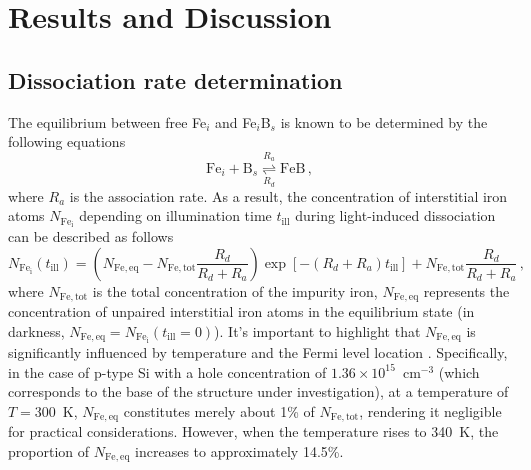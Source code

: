 \documentclass{WileyMSP-template}
\begin{document}
%
%
%
%


\section{Results and Discussion}

\subsection{Dissociation rate determination}\label{SecR}

The equilibrium between free Fe$_i$ and Fe$_i$B$_s$ is known to be determined by the following equations \cite{FeB:kinetic,Sun2021,FeBAssJAP2014}
\begin{equation}
\label{eqReac}
\mathrm{Fe}_i+\mathrm{B}_s  \overset{R_a}{\underset{R_d}{\rightleftharpoons{}}} \mathrm{FeB}\,,
\end{equation}
where
$R_a$ is the association rate.
As a result, the concentration of interstitial iron atoms $N_\mathrm{Fe_i}$ depending on illumination time $t_\mathrm{ill}$ 
during light-induced dissociation can be described as follows \cite{FeBLight2,FeBKin2019,Olikh2021JAP}
\begin{equation}
\label{eqNfeill}
N_\mathrm{Fe_i}(t_\mathrm{ill})=\left(N_\mathrm{Fe,eq}-N_\mathrm{Fe,tot}
\frac{R_d}{R_d+R_a}\right)\exp[-(R_d+R_a)t_\mathrm{ill}]+N_\mathrm{Fe,tot}\frac{R_d}{R_d+R_a}\,,
\end{equation}
where
$N_\mathrm{Fe,tot}$ is the total concentration of the impurity iron,
$N_\mathrm{Fe,eq}$ represents the concentration of unpaired interstitial iron atoms in the equilibrium state 
(in darkness, $N_\mathrm{Fe,eq}=N_\mathrm{Fe_i}(t_\mathrm{ill}=0)$).
It's important to highlight that $N_\mathrm{Fe,eq}$ is significantly influenced 
by temperature and the Fermi level location \cite{FeB:kinetic}. 
Specifically, in the case of p-type Si with a hole concentration of $1.36\times10^{15}$~cm$^{-3}$ 
(which corresponds to the base of the structure under investigation),  
at a temperature of $T=300$~K, $N_\mathrm{Fe,eq}$ constitutes merely about 1\% of $N_\mathrm{Fe,tot}$, 
rendering it negligible for practical considerations. 
However, when the temperature rises to 340~K, the proportion of $N_\mathrm{Fe,eq}$ increases to approximately 14.5\%.
\end{document}
